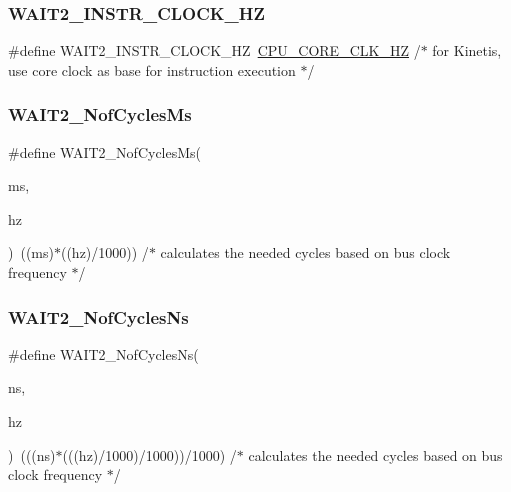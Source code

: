 \subsubsection{\texorpdfstring{W\+A\+I\+T2\+\_\+\+I\+N\+S\+T\+R\+\_\+\+C\+L\+O\+C\+K\+\_\+\+HZ}{WAIT2\_INSTR\_CLOCK\_HZ}}
{\footnotesize\ttfamily \#define W\+A\+I\+T2\+\_\+\+I\+N\+S\+T\+R\+\_\+\+C\+L\+O\+C\+K\+\_\+\+HZ~\hyperlink{group___cpu__module_ga9dee0abd722c849e54c662ab11a1d2cf}{C\+P\+U\+\_\+\+C\+O\+R\+E\+\_\+\+C\+L\+K\+\_\+\+HZ} /$\ast$ for Kinetis, use core clock as base for instruction execution $\ast$/}

\mbox{\label{group___w_a_i_t2__module_gaf13a8ab79ece3a554abaaff60399e8c8}} 
\subsubsection{\texorpdfstring{W\+A\+I\+T2\+\_\+\+Nof\+Cycles\+Ms}{WAIT2\_NofCyclesMs}}
{\footnotesize\ttfamily \#define W\+A\+I\+T2\+\_\+\+Nof\+Cycles\+Ms(\begin{DoxyParamCaption}\item[{}]{ms,  }\item[{}]{hz }\end{DoxyParamCaption})~((ms)$\ast$((hz)/1000)) /$\ast$ calculates the needed cycles based on bus clock frequency $\ast$/}

\mbox{\label{group___w_a_i_t2__module_gacbc1ee8c0a39d4fab8af0efd19fe798f}} 
\subsubsection{\texorpdfstring{W\+A\+I\+T2\+\_\+\+Nof\+Cycles\+Ns}{WAIT2\_NofCyclesNs}}
{\footnotesize\ttfamily \#define W\+A\+I\+T2\+\_\+\+Nof\+Cycles\+Ns(\begin{DoxyParamCaption}\item[{}]{ns,  }\item[{}]{hz }\end{DoxyParamCaption})~(((ns)$\ast$(((hz)/1000)/1000))/1000) /$\ast$ calculates the needed cycles based on bus clock frequency $\ast$/}

